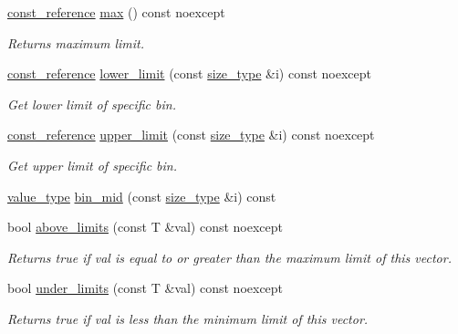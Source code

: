 \begin{DoxyCompactItemize}
\hyperlink{classIceBRG_1_1limit__vector_aed6fc504d7987040be16d150089c7893}{const\+\_\+reference} \hyperlink{classIceBRG_1_1limit__vector_a4f020c6f3e092f6cbfdc3c015de83667}{max} () const  noexcept
\begin{DoxyCompactList}\small\item\em Returns maximum limit. \end{DoxyCompactList}\item 
\hyperlink{classIceBRG_1_1limit__vector_aed6fc504d7987040be16d150089c7893}{const\+\_\+reference} \hyperlink{classIceBRG_1_1limit__vector_a90ae58089ebe3e59ca3ec43d8233370e}{lower\+\_\+limit} (const \hyperlink{classIceBRG_1_1limit__vector_a81be3eb6cd519b3f5279ef735ccc4c2f}{size\+\_\+type} \&i) const  noexcept
\begin{DoxyCompactList}\small\item\em Get lower limit of specific bin. \end{DoxyCompactList}\item 
\hyperlink{classIceBRG_1_1limit__vector_aed6fc504d7987040be16d150089c7893}{const\+\_\+reference} \hyperlink{classIceBRG_1_1limit__vector_aeaf77a5825130f2022fbebf1b9118d52}{upper\+\_\+limit} (const \hyperlink{classIceBRG_1_1limit__vector_a81be3eb6cd519b3f5279ef735ccc4c2f}{size\+\_\+type} \&i) const  noexcept
\begin{DoxyCompactList}\small\item\em Get upper limit of specific bin. \end{DoxyCompactList}\item 
\hyperlink{classIceBRG_1_1limit__vector_a9b1e2f022c18b0227b25bb571741bb28}{value\+\_\+type} \hyperlink{classIceBRG_1_1limit__vector_adf6aa961b37c72f2e25d16d66e9cc859}{bin\+\_\+mid} (const \hyperlink{classIceBRG_1_1limit__vector_a81be3eb6cd519b3f5279ef735ccc4c2f}{size\+\_\+type} \&i) const 
\item 
bool \hyperlink{classIceBRG_1_1limit__vector_a7975521646ad8dbaca8254d8a33e43b8}{above\+\_\+limits} (const T \&val) const  noexcept
\begin{DoxyCompactList}\small\item\em Returns true if val is equal to or greater than the maximum limit of this vector. \end{DoxyCompactList}\item 
bool \hyperlink{classIceBRG_1_1limit__vector_adb1b5ba25a11cfcfb4bc1979488014f5}{under\+\_\+limits} (const T \&val) const  noexcept
\begin{DoxyCompactList}\small\item\em Returns true if val is less than the minimum limit of this vector. \end{DoxyCompactList}\item 

\end{DoxyCompactItemize}
